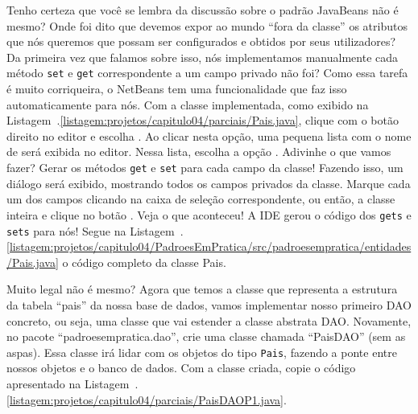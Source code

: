 
Tenho certeza que você se lembra da discussão sobre o padrão JavaBeans não é mesmo? Onde foi dito que devemos expor ao mundo ``fora da classe'' os atributos que nós queremos que possam ser configurados e obtidos por seus utilizadores? Da primeira vez que falamos sobre isso, nós implementamos manualmente cada método \texttt{set} e \texttt{get} correspondente a um campo privado não foi? Como essa tarefa é muito corriqueira, o NetBeans tem uma funcionalidade que faz isso automaticamente para nós. Com a classe implementada, como exibido na Listagem~\thechapter.\ref{listagem:projetos/capitulo04/parciais/Pais.java}, clique com o botão direito no editor e escolha . Ao clicar nesta opção, uma pequena lista com o nome de  será exibida no editor. Nessa lista, escolha a opção . Adivinhe o que vamos fazer? Gerar os métodos \texttt{get} e \texttt{set} para cada campo da classe! Fazendo isso, um diálogo será exibido, mostrando todos os campos privados da classe. Marque cada um dos campos clicando na caixa de seleção correspondente, ou então, a classe inteira e clique no botão . Veja o que aconteceu! A IDE gerou o código dos \texttt{gets} e \texttt{sets} para nós! Segue na Listagem~\thechapter.\ref{listagem:projetos/capitulo04/PadroesEmPratica/src/padroesempratica/entidades/Pais.java} o código completo da classe Pais.


Muito legal não é mesmo? Agora que temos a classe que representa a estrutura da tabela ``pais'' da nossa base de dados, vamos implementar nosso primeiro DAO concreto, ou seja, uma classe que vai estender a classe abstrata DAO. Novamente, no pacote ``padroesempratica.dao'', crie uma classe chamada ``PaisDAO'' (sem as aspas). Essa classe irá lidar com os objetos do tipo \texttt{Pais}, fazendo a ponte entre nossos objetos e o banco de dados. Com a classe criada, copie o código apresentado na Listagem~\thechapter.\ref{listagem:projetos/capitulo04/parciais/PaisDAOP1.java}.


